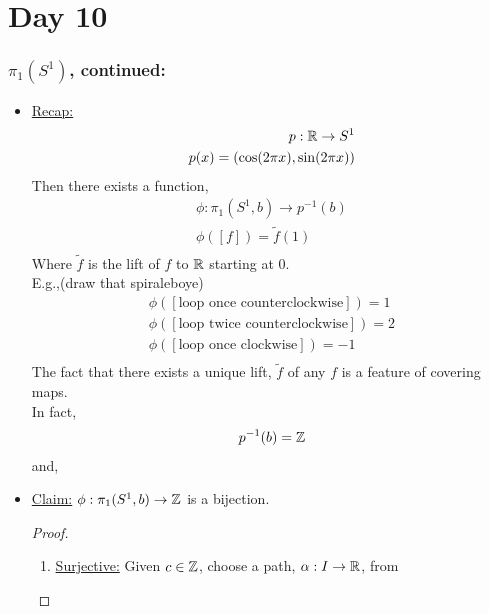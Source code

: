\section{Day 10}
    \subsubsection{$\pi_1(S^1)$, continued:}
    \begin{itemize}
        \item \underline{Recap:}
            \begin{align*}
                p: \mathbb{R} \rightarrow S^{1}\\
                p(x)=(\cos(2\pi x), \sin(2\pi x))\\
            \end{align*}
            Then there exists a function,
            \begin{align*}
                \phi : \pi_1(S^{1}, b)\rightarrow p^{-1}(b)\\
                \phi([f])=\tilde{f}(1)\\
            \end{align*}
            Where $\tilde{f}$ is the lift of $f$ to $\mathbb{R}$ starting at $0$.\\
            E.g.,(draw that spiraleboye)
            \begin{align*}
                \phi([\text{loop once counterclockwise}])=1\\
                \phi([\text{loop twice counterclockwise}])=2\\
                \phi([\text{loop once clockwise}])=-1\\
            \end{align*}
            The fact that there exists a unique lift, $\tilde{f}$ of any $f$ is a feature
            of covering maps.\\
            In fact,
            \begin{align*}
                p^{-1}(b)=\mathbb{Z}\\
            \end{align*}
            and,\\
        \item \underline{Claim:} $\phi: \pi_1(S^1, b)\rightarrow \mathbb{Z}$ is a bijection.
            \begin{proof}
                \begin{enumerate}
                    \item \underline{Surjective:} Given $c\in\mathbb{Z}$, choose a path, $\alpha: I \rightarrow \mathbb{R}$, from

\end{enumerate}
\end{proof}
\end{itemize}
